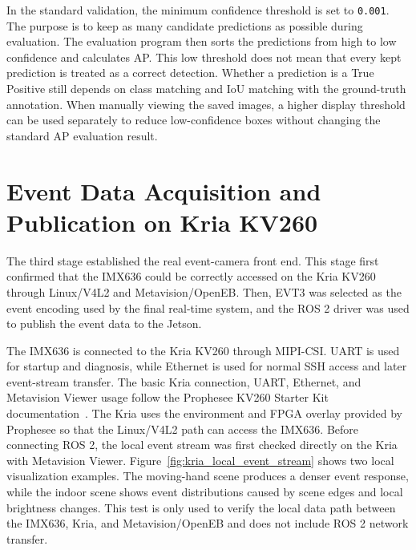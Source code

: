 In the standard validation, the minimum confidence threshold is set to \texttt{0.001}. The purpose is to keep as many candidate predictions as possible during evaluation. The evaluation program then sorts the predictions from high to low confidence and calculates AP. This low threshold does not mean that every kept prediction is treated as a correct detection. Whether a prediction is a True Positive still depends on class matching and IoU matching with the ground-truth annotation. When manually viewing the saved images, a higher display threshold can be used separately to reduce low-confidence boxes without changing the standard AP evaluation result.

\section{Event Data Acquisition and Publication on Kria KV260}

The third stage established the real event-camera front end. This stage first confirmed that the IMX636 could be correctly accessed on the Kria KV260 through Linux/V4L2 and Metavision/OpenEB. Then, EVT3 was selected as the event encoding used by the final real-time system, and the ROS 2 driver was used to publish the event data to the Jetson.

The IMX636 is connected to the Kria KV260 through MIPI-CSI. UART is used for startup and diagnosis, while Ethernet is used for normal SSH access and later event-stream transfer. The basic Kria connection, UART, Ethernet, and Metavision Viewer usage follow the Prophesee KV260 Starter Kit documentation~\parencite{propheseeKriaDeployment}. The Kria uses the environment and FPGA overlay provided by Prophesee so that the Linux/V4L2 path can access the IMX636. Before connecting ROS 2, the local event stream was first checked directly on the Kria with Metavision Viewer. Figure~\ref{fig:kria_local_event_stream} shows two local visualization examples. The moving-hand scene produces a denser event response, while the indoor scene shows event distributions caused by scene edges and local brightness changes. This test is only used to verify the local data path between the IMX636, Kria, and Metavision/OpenEB and does not include ROS 2 network transfer.

